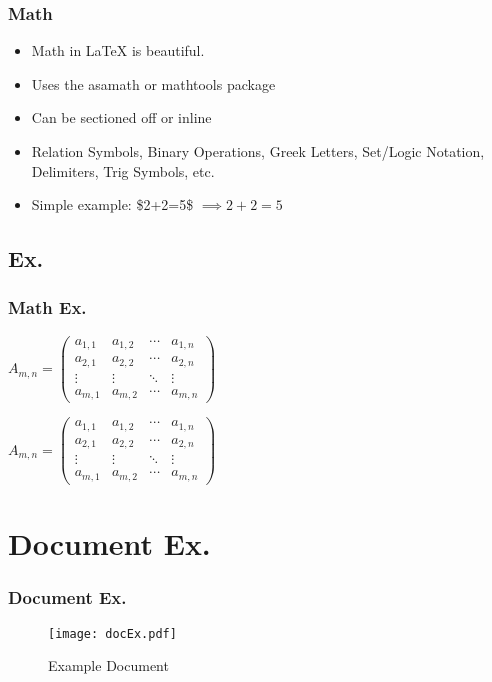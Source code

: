 \begin{frame}
\frametitle{Math}
\begin{itemize}
    \item Math in \LaTeX{} is beautiful.
    \item Uses the asamath or mathtools package
    \item Can be sectioned off or inline
    \item Relation Symbols, Binary Operations, Greek Letters, Set/Logic
        Notation, Delimiters, Trig Symbols, etc.
    \item Simple example: \$2+2=5\$ $\implies 2+2=5$
\end{itemize}
\end{frame}

\subsection{Ex.}

\begin{frame}[allowframebreaks=0.8,fragile]
\frametitle{Math Ex.}
\begin{teX}
\begin{math}
A_{m,n} =
 \begin{pmatrix}
  a_{1,1} & a_{1,2} & \cdots & a_{1,n} \\
  a_{2,1} & a_{2,2} & \cdots & a_{2,n} \\
  \vdots  & \vdots  & \ddots & \vdots  \\
  a_{m,1} & a_{m,2} & \cdots & a_{m,n}
 \end{pmatrix}
 \end{math}
\end{teX}

\framebreak

\begin{math}
A_{m,n} =
 \begin{pmatrix}
  a_{1,1} & a_{1,2} & \cdots & a_{1,n} \\
  a_{2,1} & a_{2,2} & \cdots & a_{2,n} \\
  \vdots  & \vdots  & \ddots & \vdots  \\
  a_{m,1} & a_{m,2} & \cdots & a_{m,n}
 \end{pmatrix}
 \end{math}
\end{frame}


\section{Document Ex.}

\begin{frame}[allowframebreaks=0.8,fragile]
\frametitle{Document Ex.}

\framebreak
\begin{figure}[DocEx] 
  \begin{centering}
  \texttt{[image: docEx.pdf]}
  \caption{Example Document}
  \end{centering}
\end{figure}
\end{frame}
